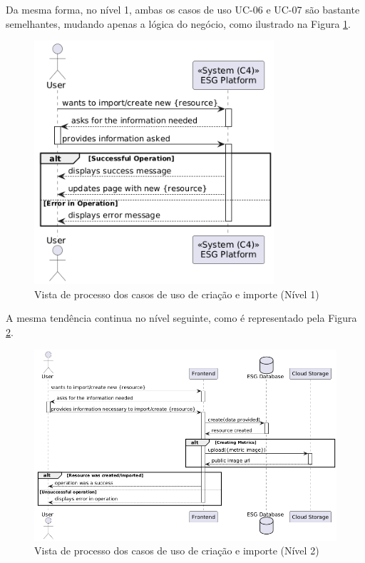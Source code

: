 Da mesma forma, no nível 1, ambas os casos de uso UC-06 e UC-07 são bastante semelhantes, mudando apenas a lógica do negócio, como ilustrado na Figura \ref{fig:UC67-lvl1}.

\begin{figure}[H]
\centering
\includegraphics[width=3.5in]{frontmatter/assets/diagrams/Process Views/UC67-lvl1.png}
\caption{Vista de processo dos casos de uso de criação e importe (Nível 1)}
\label{fig:UC67-lvl1}
\end{figure}

A mesma tendência continua no nível seguinte, como é representado pela Figura \ref{fig:UC67-lvl2}.

\begin{figure}[H]
\centering
\includegraphics[width=\linewidth]{frontmatter/assets/diagrams/Process Views/UC67-lvl2.png}
\caption{Vista de processo dos casos de uso de criação e importe (Nível 2)}
\label{fig:UC67-lvl2}
\end{figure}

